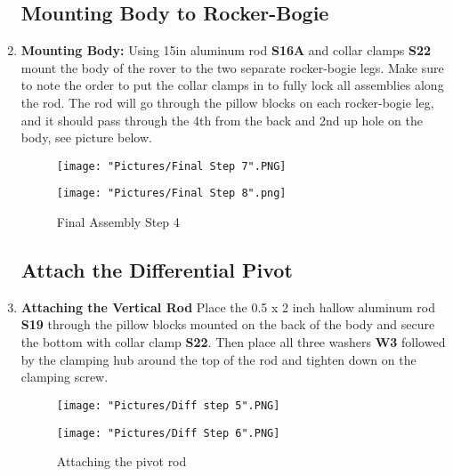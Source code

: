 \documentclass[12pt]{article}
\begin{document}
\begin{enumerate}
\subsection{Mounting Body to Rocker-Bogie}

\item \textbf{Mounting Body: } Using 15in aluminum rod \textbf{S16A} and collar clamps \textbf{S22} mount the body of the rover to the two separate rocker-bogie legs. Make sure to note the order to put the collar clamps in to fully lock all assemblies along the rod. The rod will go through the pillow blocks on each rocker-bogie leg, and it should pass through the 4th from the back and 2nd up hole on the body, see picture below. 

\begin{figure}[H]
  \centering
  \begin{minipage}[b]{0.45\textwidth}
    \texttt{[image: "Pictures/Final Step 7".PNG]}
  \end{minipage}
  \hfill
  \begin{minipage}[b]{0.45\textwidth}
    \texttt{[image: "Pictures/Final Step 8".png]}
  \end{minipage}
  \caption{Final Assembly Step 4}
\end{figure}


\subsection{Attach the Differential Pivot}

\item \textbf{Attaching the Vertical Rod} Place the 0.5 x 2 inch hallow aluminum rod \textbf{S19} through the pillow blocks mounted on the back of the body and secure the bottom with collar clamp \textbf{S22}. Then place all three washers 
\textbf{W3} followed by the clamping hub around the top of the rod and tighten down on the clamping screw. 

\begin{figure}[H]
  	\centering
  	\begin{minipage}[b]{0.35\textwidth}
   		\texttt{[image: "Pictures/Diff step 5".PNG]}
  	\end{minipage}
  	\hfill
  	\begin{minipage}[b]{0.35\textwidth}
    		\texttt{[image: "Pictures/Diff Step 6".PNG]}
  	\end{minipage}
  	\caption{Attaching the pivot rod}
\end{figure}


\end{enumerate}
\end{document}
